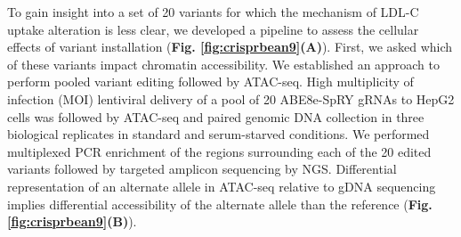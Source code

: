 \documentclass[a4paper, titlepage, openright]{book}
\begin{document}
To gain insight into a set of 20 variants for which the mechanism of LDL-C uptake alteration is less clear, we developed a pipeline to assess the cellular effects of variant installation (\textbf{Fig. \ref{fig:crisprbean9}(A)}). First, we asked which of these variants impact chromatin accessibility. We established an approach to perform pooled variant editing followed by ATAC-seq. High multiplicity of infection (MOI) lentiviral delivery of a pool of 20 ABE8e-SpRY gRNAs to HepG2 cells was followed by ATAC-seq and paired genomic DNA collection in three biological replicates in standard and serum-starved conditions. We performed multiplexed PCR enrichment of the regions surrounding each of the 20 edited variants followed by targeted amplicon sequencing by NGS. Differential representation of an alternate allele in ATAC-seq relative to gDNA sequencing implies differential accessibility of the alternate allele than the reference (\textbf{Fig. \ref{fig:crisprbean9}(B)}).
\end{document}
